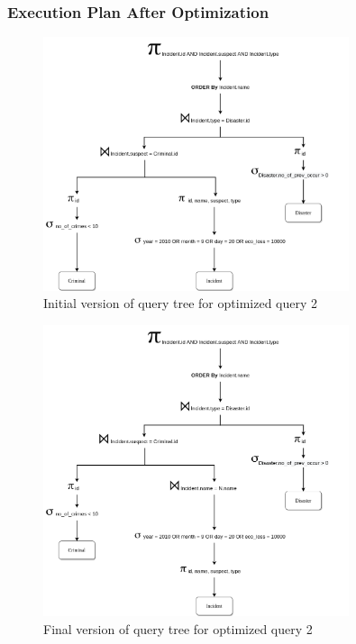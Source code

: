 \subsubsection{Execution Plan After Optimization}
\begin{figure}[H]
    \centering
    \includegraphics[width=0.8\textwidth]{images/query_trees/query2-optimized-initial-version.png}
    \caption{Initial version of query tree for optimized query 2}
\end{figure}
\begin{figure}[H]
    \centering
    \includegraphics[width=0.8\textwidth]{images/query_trees/query2-optimized-final-version.png}
    \caption{Final version of query tree for optimized query 2}
\end{figure}
